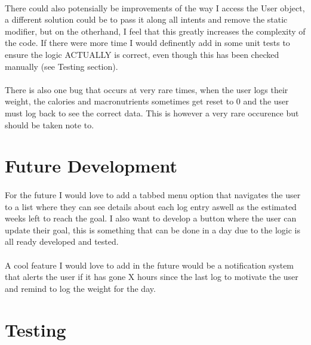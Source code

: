 \documentclass{article}
\begin{document}
\paragraph{}
    There could also potensially be improvements of the way I access the User object, a different solution could be to pass it along all intents and remove
    the static modifier, but on the otherhand, I feel that this greatly increases the complexity of the code. If there were more time I would definently add in some unit tests
    to ensure the logic ACTUALLY is correct, even though this has been checked manually (see Testing section).

\paragraph{}
    There is also one bug that occurs at very rare times, when the user
    logs their weight, the calories and macronutrients sometimes get reset to 0 and the user must log back to see the correct data. This is however a very rare occurence but should
    be taken note to. 

    \hfill \break
    \hfill \break

\section{Future Development}
\paragraph{}
    For the future I would love to add a tabbed menu option that navigates the user to a list where they can see details about each log entry aswell as the estimated
    weeks left to reach the goal. I also want to develop a button where the user can update their goal, this is something that can be done in a day due to the logic
    is all ready developed and tested.

\paragraph{}
    A cool feature I would love to add in the future would be a notification system that alerts the user if it has gone X hours since the last log to motivate the
    user and remind to log the weight for the day.

    \hfill \break
    \hfill \break

\section{Testing}
\end{document}
